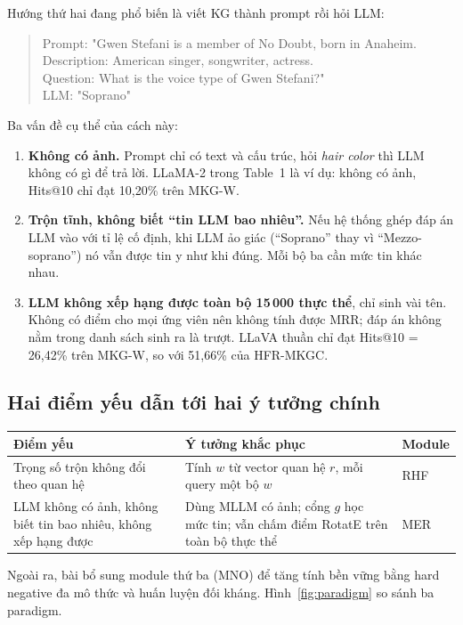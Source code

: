 \documentclass[11pt,a4paper]{article}
\newcommand{\Ent}[1]{\textit{#1}}
\begin{document}
Hướng thứ hai đang phổ biến là viết KG thành prompt rồi hỏi LLM:
\begin{quote}\small\ttfamily
Prompt: "Gwen Stefani is a member of No Doubt, born in Anaheim.\\
\phantom{Prompt: "}Description: American singer, songwriter, actress.\\
\phantom{Prompt: "}Question: What is the voice type of Gwen Stefani?"\\
LLM: "Soprano"
\end{quote}

Ba vấn đề cụ thể của cách này:
\begin{enumerate}[label=(\alph*)]
\item \textbf{Không có ảnh.} Prompt chỉ có text và cấu trúc, hỏi \Ent{hair color} thì LLM không có gì để trả lời. LLaMA-2 trong Table~1 là ví dụ: không có ảnh, Hits@10 chỉ đạt 10,20\% trên MKG-W.
\item \textbf{Trộn tĩnh, không biết ``tin LLM bao nhiêu''.} Nếu hệ thống ghép đáp án LLM vào với tỉ lệ cố định, khi LLM ảo giác (``Soprano'' thay vì ``Mezzo-soprano'') nó vẫn được tin y như khi đúng. Mỗi bộ ba cần mức tin khác nhau.
\item \textbf{LLM không xếp hạng được toàn bộ 15\,000 thực thể}, chỉ sinh vài tên. Không có điểm cho mọi ứng viên nên không tính được MRR; đáp án không nằm trong danh sách sinh ra là trượt. LLaVA thuần chỉ đạt Hits@10 = 26,42\% trên MKG-W, so với 51,66\% của HFR-MKGC.
\end{enumerate}

\subsection{Hai điểm yếu dẫn tới hai ý tưởng chính}

\begin{table}[H]
\centering\small
\begin{tabular}{@{}p{4.3cm}p{7.2cm}l@{}}
\toprule
Điểm yếu & Ý tưởng khắc phục & Module\\
\midrule
Trọng số trộn không đổi theo quan hệ & Tính $w$ từ vector quan hệ $r$, mỗi query một bộ $w$ & RHF\\
LLM không có ảnh, không biết tin bao nhiêu, không xếp hạng được & Dùng MLLM có ảnh; cổng $g$ học mức tin; vẫn chấm điểm RotatE trên toàn bộ thực thể & MER\\
\bottomrule
\end{tabular}
\end{table}

Ngoài ra, bài bổ sung module thứ ba (MNO) để tăng tính bền vững bằng hard negative đa mô thức và huấn luyện đối kháng. Hình~\ref{fig:paradigm} so sánh ba paradigm.
\end{document}
